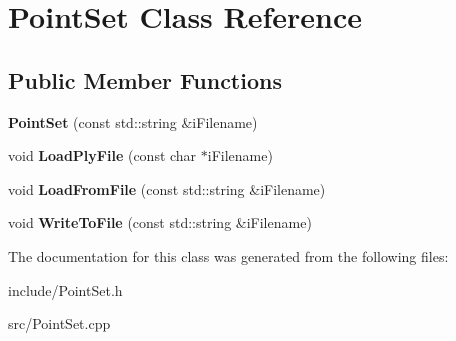 \hypertarget{classPointSet}{\section{Point\-Set Class Reference}
\label{classPointSet}
}
\subsection*{Public Member Functions}
\begin{DoxyCompactItemize}
\item 
\hypertarget{classPointSet_a059fe6001efec32de7d85fc2396d7ef5}{{\bfseries Point\-Set} (const std\-::string \&i\-Filename)}\label{classPointSet_a059fe6001efec32de7d85fc2396d7ef5}

\item 
\hypertarget{classPointSet_a68f19e739da8763e5a9b4a31dba60aea}{void {\bfseries Load\-Ply\-File} (const char $\ast$i\-Filename)}\label{classPointSet_a68f19e739da8763e5a9b4a31dba60aea}

\item 
\hypertarget{classPointSet_aed9959e267ef0c0ca7ae8cb367ae2a52}{void {\bfseries Load\-From\-File} (const std\-::string \&i\-Filename)}\label{classPointSet_aed9959e267ef0c0ca7ae8cb367ae2a52}

\item 
\hypertarget{classPointSet_ad81b5ae55aae5f3fc5ee97f93c740d49}{void {\bfseries Write\-To\-File} (const std\-::string \&i\-Filename)}\label{classPointSet_ad81b5ae55aae5f3fc5ee97f93c740d49}

\end{DoxyCompactItemize}


The documentation for this class was generated from the following files\-:\begin{DoxyCompactItemize}
\item 
include/Point\-Set.\-h\item 
src/Point\-Set.\-cpp\end{DoxyCompactItemize}
